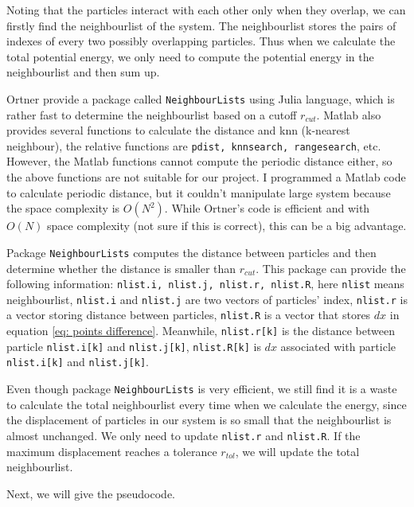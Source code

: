 \documentclass[a4paper]{article}
\begin{document}
Noting that the particles interact with each other only when they overlap, we can firstly find the neighbourlist of the system. The neighbourlist stores the pairs of indexes of every two possibly overlapping particles. Thus when we calculate the total potential energy, we only need to compute the potential energy in the neighbourlist and then sum up.

Ortner provide a package called \texttt{\textprime NeighbourLists\textprime } using Julia language, which is rather fast to determine the neighbourlist based on a cutoff $r_{cut}$. Matlab also provides several functions to calculate the distance and knn (k-nearest neighbour), the relative functions are \texttt{pdist, knnsearch, rangesearch}, etc. However, the Matlab functions cannot compute the periodic distance either, so the above functions are not suitable for our project. I programmed a Matlab code to calculate periodic distance, but it couldn't manipulate large system because the space complexity is $O(N^2)$. While Ortner's code is efficient and {\color{red}with $O(N)$ space complexity (not sure if this is correct)}, this can be a big advantage. 

Package \texttt{\textprime NeighbourLists\textprime } computes the distance between particles and then determine whether the distance is smaller than $r_{cut}$. 
This package can provide the following information:
\texttt{nlist.i, nlist.j, nlist.r, nlist.R}, here \texttt{nlist} means neighbourlist, \texttt{nlist.i} and \texttt{nlist.j} are two vectors of particles' index, \texttt{nlist.r} is a vector storing distance between particles, \texttt{nlist.R} is a vector that stores $dx$ in equation \eqref{eq: points difference}. Meanwhile, \texttt{nlist.r[k]} is the distance between particle \texttt{nlist.i[k]} and \texttt{nlist.j[k]}, \texttt{nlist.R[k]} is $dx$ associated with particle \texttt{nlist.i[k]} and \texttt{nlist.j[k]}.

Even though package \texttt{\textprime NeighbourLists\textprime } is very efficient, we still find it is a waste to calculate the total neighbourlist every time when we calculate the energy, since the displacement of particles in our system is so small that the neighbourlist is almost unchanged. We only need to update \texttt{nlist.r} and \texttt{nlist.R}. If the maximum displacement reaches a tolerance $r_{tol}$, we will update the total neighbourlist.

Next, we will give the pseudocode.
\end{document}
